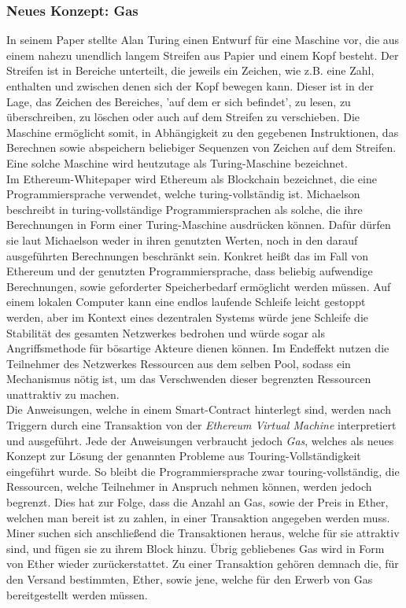 \subsubsection{Neues Konzept: Gas}
In seinem Paper \cite{turing_1936} stellte Alan Turing einen Entwurf für eine Maschine vor, die aus einem nahezu unendlich langem Streifen aus Papier und einem Kopf besteht. Der Streifen ist in Bereiche unterteilt, die jeweils ein Zeichen, wie z.B. eine Zahl, enthalten und zwischen denen sich der Kopf bewegen kann. Dieser ist in der Lage, das Zeichen des Bereiches, 'auf dem er sich befindet', zu lesen, zu überschreiben, zu löschen oder auch auf dem Streifen zu verschieben. Die Maschine ermöglicht somit, in Abhängigkeit zu den gegebenen Instruktionen, das Berechnen sowie abspeichern beliebiger Sequenzen von Zeichen auf dem Streifen. Eine solche Maschine wird heutzutage als Turing-Maschine bezeichnet.\\

Im Ethereum-Whitepaper \cite{buterin_whitepaper_2013} wird Ethereum als Blockchain bezeichnet, die eine Programmiersprache verwendet, welche turing-vollständig ist. Michaelson beschreibt in \cite{Michaelson_2020} turing-vollständige Programmiersprachen als solche, die ihre Berechnungen in Form einer Turing-Maschine ausdrücken können. Dafür dürfen sie laut Michaelson weder in ihren genutzten Werten, noch in den darauf ausgeführten Berechnungen beschränkt sein. Konkret heißt das im Fall von Ethereum und der genutzten Programmiersprache, dass beliebig aufwendige Berechnungen, sowie geforderter Speicherbedarf ermöglicht werden müssen.
Auf einem lokalen Computer kann eine endlos laufende Schleife leicht gestoppt werden, aber im Kontext eines dezentralen Systems würde jene Schleife die Stabilität des gesamten Netzwerkes bedrohen und würde sogar als Angriffsmethode für bösartige Akteure dienen können. Im Endeffekt nutzen die Teilnehmer des Netzwerkes Ressourcen aus dem selben Pool, sodass ein Mechanismus nötig ist, um das Verschwenden dieser begrenzten Ressourcen unattraktiv zu machen.\\

Die Anweisungen, welche in einem Smart-Contract hinterlegt sind, werden nach Triggern durch eine Transaktion von der \emph{Ethereum Virtual Machine} interpretiert und ausgeführt. Jede der Anweisungen verbraucht jedoch \emph{Gas}, welches als neues Konzept zur Lösung der genannten Probleme aus Touring-Vollständigkeit eingeführt wurde. So bleibt die Programmiersprache zwar touring-vollständig, die Ressourcen, welche Teilnehmer in Anspruch nehmen können, werden jedoch begrenzt. Dies hat zur Folge, dass die Anzahl an Gas, sowie der Preis in Ether, welchen man bereit ist zu zahlen, in einer Transaktion angegeben werden muss. Miner suchen sich anschließend die Transaktionen heraus, welche für sie attraktiv sind, und fügen sie zu ihrem Block hinzu. Übrig gebliebenes Gas wird in Form von Ether wieder zurückerstattet. Zu einer Transaktion gehören demnach die, für den Versand bestimmten, Ether, sowie jene, welche für den Erwerb von Gas bereitgestellt werden müssen.
